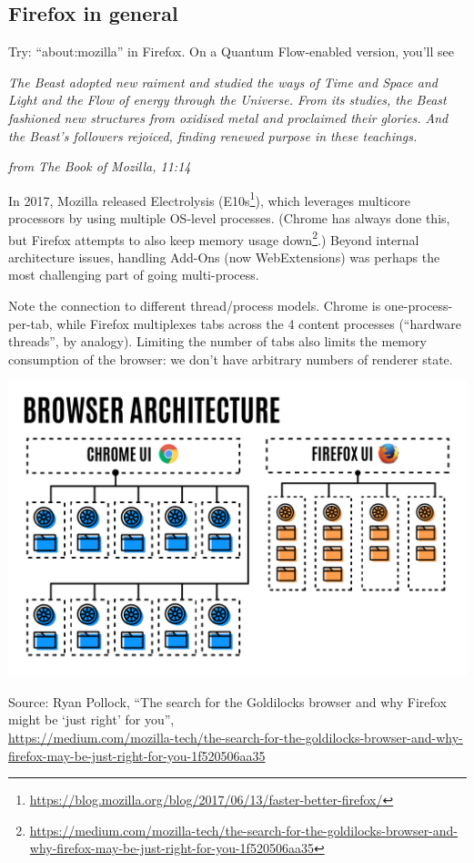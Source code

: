 \documentclass[a4paper]{report}
\begin{document}
\subsection*{Firefox in general}

Try: ``about:mozilla'' in Firefox. On a Quantum Flow-enabled version, you'll see

\begin{center}
\emph{The Beast adopted new raiment and studied the ways of Time and Space and Light and the Flow of energy through the Universe. From its studies, the Beast fashioned new structures from oxidised metal and proclaimed their glories. And the Beast’s followers rejoiced, finding renewed purpose in these teachings.}

\hfill \emph{from The Book of Mozilla, 11:14}
\end{center}

In 2017, Mozilla released Electrolysis
(E10s\footnote{\url{https://blog.mozilla.org/blog/2017/06/13/faster-better-firefox/}}),
which leverages multicore processors by using multiple OS-level
processes. (Chrome has always done this, but Firefox attempts to also
keep memory usage
down\footnote{\url{https://medium.com/mozilla-tech/the-search-for-the-goldilocks-browser-and-why-firefox-may-be-just-right-for-you-1f520506aa35}}.)
Beyond internal architecture issues, handling Add-Ons (now
WebExtensions) was perhaps the most challenging part of going
multi-process.

Note the connection to different thread/process models.
Chrome is one-process-per-tab, while Firefox multiplexes tabs across
the 4 content processes (``hardware threads'', by analogy). Limiting
the number of tabs also limits the memory consumption of the browser:
we don't have arbitrary numbers of renderer state.

\begin{center}
\includegraphics[width=.9\textwidth]{images/L19-chrome-vs-firefox.png}
\end{center}
Source: Ryan Pollock, ``The search for the Goldilocks browser and why Firefox might be `just right' for you'', \\
{\scriptsize \url{https://medium.com/mozilla-tech/the-search-for-the-goldilocks-browser-and-why-firefox-may-be-just-right-for-you-1f520506aa35}}
\end{document}
